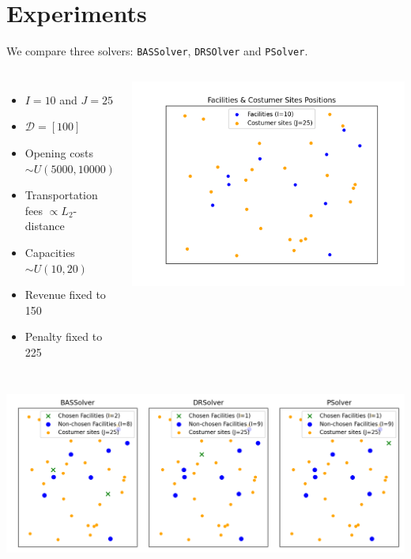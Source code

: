 \documentclass{beamer}
\newcommand{\Dcal}{\mathcal{D}}
\begin{document}
\section{Experiments} %
\begin{frame}[allowframebreaks]
	We compare three solvers: \texttt{BASSolver}, \texttt{DRSOlver} and \texttt{PSolver}.
	\begin{columns}
		\begin{itemize}
			\item $I = 10$ and $J = 25$
			\item $\Dcal = [100]$
			\item Opening costs $\sim U(5000, 10000)$
			\item Transportation fees $\propto L_2$-distance
			\item Capacities $\sim U(10, 20)$
			\item Revenue fixed to 150
			\item Penalty fixed to 225
		\end{itemize}
		
		\includegraphics[width=\textwidth]{../figure/facility_costumer_site_pos.png}
	\end{columns}
	
	\framebreak
	\includegraphics[width=\textwidth]{../figure/chosen_facility_costumer_site_pos.png}
	

\end{frame}
\end{document}
